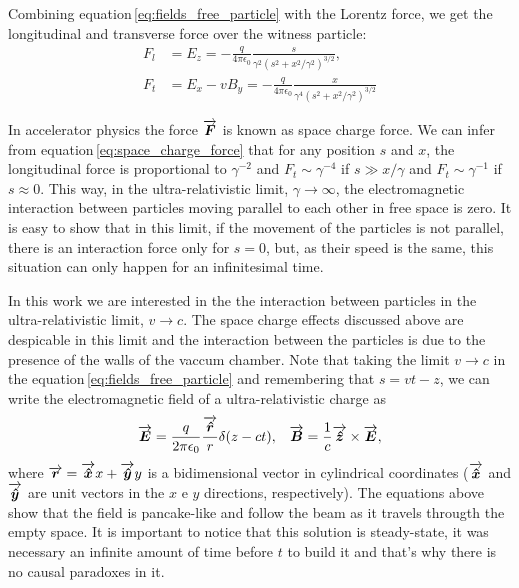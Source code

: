 Combining equation\,\ref{eq:fields_free_particle} with the Lorentz force, we get the longitudinal and transverse force over the witness particle:
\begin{align}\label{eq:space_charge_force}
 F_l &= E_z = -\frac{q}{4\pi\epsilon_0}\frac{s}{\gamma^2\left(s^2+x^2/\gamma^2\right)^{3/2}}, \\
 F_t &= E_x - vB_y = -\frac{q}{4\pi\epsilon_0}\frac{x}{\gamma^4\left(s^2+x^2/\gamma^2\right)^{3/2}}
\end{align}

In accelerator physics the force $\overrightarrow{\boldsymbol{F}}$ is known as space charge force. We can infer from equation\,\ref{eq:space_charge_force} that for any position $s$ and $x$, the longitudinal force is proportional to $\gamma^{-2}$ and $F_t \sim \gamma^{-4}$ if $s \gg x/\gamma$ and  $F_t \sim \gamma^{-1}$ if $s \approx 0$. This way, in the ultra-relativistic limit, $\gamma \to \infty$, the electromagnetic interaction between particles moving parallel to each other in free space is zero. It is easy to show that in this limit, if the movement of the particles is not parallel, there is an interaction force only for $s=0$, but, as their speed is the same, this situation can only happen for an infinitesimal time.


In this work we are interested in the the interaction between particles in the ultra-relativistic limit, $v \to c$. The space charge effects discussed above are despicable in this limit and the interaction between the particles is due to the presence of the walls of the vaccum chamber. Note that taking the limit $v \to c$ in the equation\,\ref{eq:fields_free_particle} and remembering that $s = vt - z$, we can write the electromagnetic field of a ultra-relativistic charge as
\begin{align}
\overrightarrow{\boldsymbol{E}} = \frac{q}{2\pi\epsilon_0}\frac{\overrightarrow{\boldsymbol{\hat{r}}}}{r}\delta(z-ct), & & \overrightarrow{\boldsymbol{B}} =\frac{1}{c}\overrightarrow{\boldsymbol{\hat{z}}}\times\overrightarrow{\boldsymbol{E}},
\end{align}
where $\overrightarrow{\boldsymbol{r}} = \overrightarrow{\boldsymbol{\hat{x}}}x + \overrightarrow{\boldsymbol{\hat{y}}}y$ is a bidimensional vector in cylindrical coordinates ($\overrightarrow{\boldsymbol{\hat{x}}}$ and $\overrightarrow{\boldsymbol{\hat{y}}}$ are unit vectors in the $x$ e $y$ directions, respectively). The equations above show that the field is pancake-like and follow the beam as it travels througth the empty space. It is important to notice that this solution is steady-state, it was necessary an infinite amount of time before $t$ to build it and that's why there is no causal paradoxes in it.

